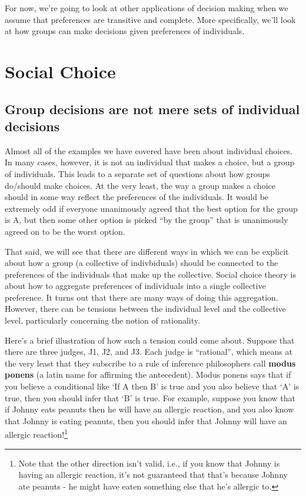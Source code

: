 \documentclass[]{tufte-book}
\begin{document}
For now, we're going to look at other applications of decision making when we assume that preferences are transitive and complete. More specifically, we'll look at how groups can make decisions given preferences of individuals.

\hypertarget{social-choice}{%
\section{Social Choice}\label{social-choice}}

\hypertarget{group-decisions-are-not-mere-sets-of-individual-decisions}{%
\subsection{Group decisions are not mere sets of individual decisions}\label{group-decisions-are-not-mere-sets-of-individual-decisions}}

Almost all of the examples we have covered have been about individual choices. In many cases, however, it is not an individual that makes a choice, but a group of individuals. This leads to a separate set of questions about how groups do/should make choices. At the very least, the way a group makes a choice should in some way reflect the preferences of the individuals. It would be extremely odd if everyone unanimously agreed that the best option for the group is A, but then some other option is picked ``by the group'' that is unanimously agreed on to be the worst option.

That said, we will see that there are different ways in which we can be explicit about how a group (a collective of indivbiduals) should be connected to the preferences of the individuals that make up the collective. Social choice theory is about how to aggregate preferences of individuals into a single collective preference. It turns out that there are many ways of doing this aggregation. However, there can be tensions between the individual level and the collective level, particularly concerning the notion of rationality.

Here's a brief illustration of how such a tension could come about. Suppose that there are three judges, J1, J2, and J3. Each judge is ``rational'', which means at the very least that they subscribe to a rule of inference philosophers call \textbf{modus ponens} (a latin name for affirming the antecedent). Modus ponens says that if you believe a conditional like `If A then B' is true and you also believe that `A' is true, then you should infer that `B' is true. For example, suppose you know that if Johnny eats peanuts then he will have an allergic reaction, and you also know that Johnny is eating peanuts, then you should infer that Johnny will have an allergic reaction!\footnote{Note that the other direction isn't valid, i.e., if you know that Johnny is having an allergic reaction, it's not guaranteed that that's because Johnny ate peanuts - he might have eaten something else that he's allergic to.}
\end{document}
